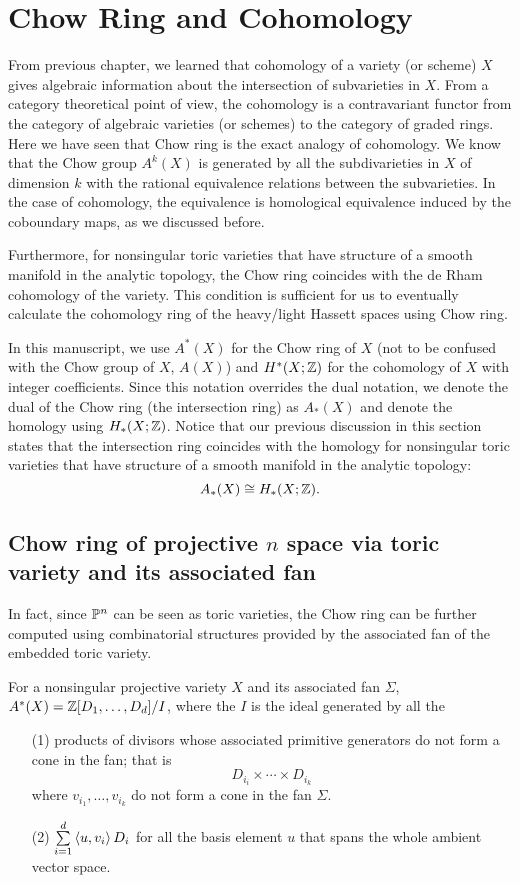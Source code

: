 \section{Chow Ring and Cohomology}
From previous chapter, 
we learned that cohomology of a variety (or scheme) $X$
gives algebraic information about the intersection of subvarieties in $X$.
From a category theoretical point of view,
the cohomology is a contravariant functor from the category of algebraic varieties (or schemes) to the category of graded rings. 
Here we have seen that Chow ring is the exact analogy of cohomology.
We know that the Chow group $A^k(X)$ is generated 
by all the subdivarieties in $X$ of dimension $k$ 
with the rational equivalence relations between the subvarieties.
In the case of cohomology, the equivalence is homological equivalence 
induced by the coboundary maps, as we discussed before. 

Furthermore, for nonsingular toric varieties that have structure of 
a smooth manifold in the analytic topology, 
the Chow ring coincides with the de Rham cohomology of the variety.
This condition is sufficient for us to eventually calculate the 
cohomology ring of the heavy/light Hassett spaces using Chow ring. 

In this manuscript, we use $A^\ast(X)$ for the Chow ring of $X$
(not to be confused with the Chow group of $X$, $A(X)$) 
and $H^\ast(X; \Z)$ for the cohomology of $X$ with integer coefficients. Since this notation overrides the dual notation,
we denote the dual of the Chow ring (the intersection ring) as $A_\ast(X)$ 
and denote the homology using $H_\ast(X; \Z)$.
Notice that our previous discussion in this section states that
the intersection ring coincides with the homology 
for nonsingular toric varieties that have structure of a smooth manifold
in the analytic topology:
\[
A_\ast(X) \cong H_\ast(X; \Z).
\]

\subsection{Chow ring of projective $n$ space via toric variety and its associated fan}
	In fact, since $\P^n$ can be seen as toric varieties,
	the Chow ring can be further computed using combinatorial structures
	provided by the associated fan of the embedded toric variety.
	
	\begin{theorem}
		For a nonsingular projective variety $X$ 
		and its associated fan $\Sigma$,
		$A^\ast(X) = \Z[D_1, \ldots, D_d]/I$,
		where the $I$ is the ideal generated by all the 
		\begin{enumerate}	
			\item[(1)]
			products of divisors whose associated primitive generators 
			do not form a cone in the fan;
			that is 
			\[
			D_{i_i} \times \cdots \times D_{i_k}
			\]
			where $v_{i_1}, \ldots, v_{i_k}$ do not form a cone 
			in the fan $\Sigma$. 
			
			\item[(2)]
			$\sum\limits_{i = 1}^{d} \inner{u, v_i} D_i$
			for all the basis element $u$ that spans 
			the whole ambient vector space. 
		\end{enumerate}
	\end{theorem}
	
